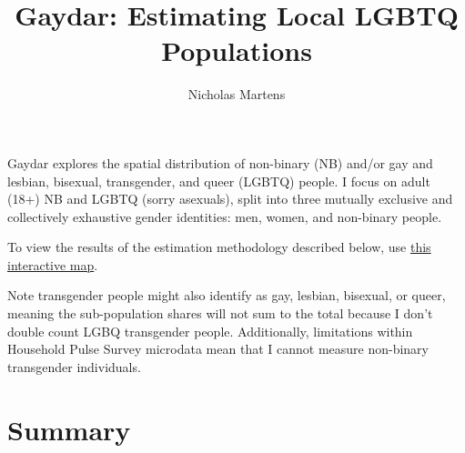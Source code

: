 \documentclass[11pt]{article}
\title{Gaydar: Estimating Local LGBTQ Populations}
\author{Nicholas Martens}
\date{}
\begin{document}
\maketitle

\begin{abstract}
\end{abstract}

Gaydar explores the spatial distribution of non-binary (NB) and/or gay and lesbian, bisexual, transgender, and queer (LGBTQ) people. I focus on adult (18+) NB and LGBTQ (sorry asexuals), split into three mutually exclusive and collectively exhaustive gender identities: men, women, and non-binary people.

To view the results of the estimation methodology described below, use 
\href{https://martensn.shinyapps.io/gaydar/}{this interactive map}.

Note transgender people might also identify as gay, lesbian, bisexual, or
queer, meaning the sub-population shares will not sum to the total because I
don't double count LGBQ transgender people. Additionally, limitations within
Household Pulse Survey microdata mean that I cannot measure non-binary
transgender individuals.

\section*{Summary}
\end{document}
